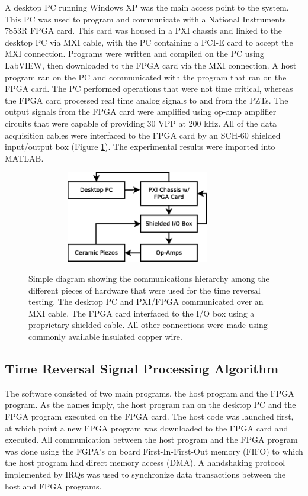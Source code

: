 \documentclass[11pt,letterpaper]{article}%
\begin{document}
A desktop PC running Windows XP was the main access point to the system. This PC was used to program and communicate with a National Instruments 7853R FPGA card. This card was housed in a PXI chassis and linked to the desktop PC via MXI cable, with the PC containing a PCI-E card to accept the MXI connection. Programs were written and compiled on the PC using LabVIEW, then downloaded to the FPGA card via the MXI connection. A host program ran on the PC and communicated with the program that ran on the FPGA card. The PC performed operations that were not time critical, whereas the FPGA card processed real time analog signals to and from the PZTs. The output signals from the FPGA card were amplified using op-amp amplifier circuits that were capable of providing $30$ VPP at $200$ kHz. All of the data acquisition cables were interfaced to the FPGA card by an SCH-60 shielded input/output box (Figure \ref{hardwareDiag}). The experimental results were imported into MATLAB.

\begin{figure}
\begin{center}
{\includegraphics[width=9.7cm,height=4cm]{hardwareComm.eps}}
 \caption[comp1]
   { \label{hardwareDiag}
   Simple diagram showing the communications hierarchy among the different pieces of hardware that were used for the time reversal testing. The desktop PC and PXI/FPGA communicated over an MXI cable. The FPGA card interfaced to the I/O box using a proprietary shielded cable. All other connections were made using commonly available insulated copper wire.
 }
 \end{center}
 \end{figure}

\subsection{Time Reversal Signal Processing Algorithm}
\label{trAlgorithm}
The software consisted of two main programs, the host program and the FPGA program. As the names imply, the host program ran on the desktop PC and the FPGA program executed on the FPGA card. The host code was launched first, at which point a new FPGA program was downloaded to the FPGA card and executed. All communication between the host program and the FPGA program was done using the FGPA's on board First-In-First-Out memory (FIFO) to which the host program had direct memory access (DMA). A handshaking protocol implemented by IRQs was used to synchronize data transactions between the host and FPGA programs.
\end{document}
